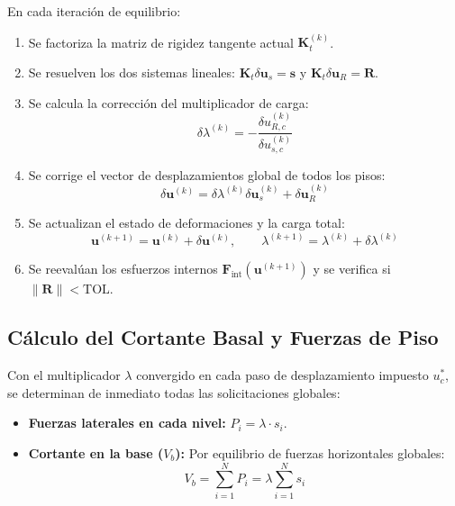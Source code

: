 \documentclass[11pt,letterpaper]{article}
\begin{document}
\begin{stepbox}
En cada iteración de equilibrio:
\begin{enumerate}
    \item Se factoriza la matriz de rigidez tangente actual $\mathbf{K}_t^{(k)}$.
    \item Se resuelven los dos sistemas lineales: $\mathbf{K}_t \delta \mathbf{u}_s = \mathbf{s}$ y $\mathbf{K}_t \delta \mathbf{u}_R = \mathbf{R}$.
    \item Se calcula la corrección del multiplicador de carga:
    $$\delta \lambda^{(k)} = -\frac{\delta u_{R,c}^{(k)}}{\delta u_{s,c}^{(k)}}$$
    \item Se corrige el vector de desplazamientos global de todos los pisos:
    $$\delta \mathbf{u}^{(k)} = \delta \lambda^{(k)} \delta \mathbf{u}_s^{(k)} + \delta \mathbf{u}_R^{(k)}$$
    \item Se actualizan el estado de deformaciones y la carga total:
    $$\mathbf{u}^{(k+1)} = \mathbf{u}^{(k)} + \delta \mathbf{u}^{(k)}, \qquad \lambda^{(k+1)} = \lambda^{(k)} + \delta \lambda^{(k)}$$
    \item Se reevalúan los esfuerzos internos $\mathbf{F}_{\text{int}}(\mathbf{u}^{(k+1)})$ y se verifica si $\|\mathbf{R}\| < \text{TOL}$.
\end{enumerate}
\end{stepbox}

\subsection{Cálculo del Cortante Basal y Fuerzas de Piso}
Con el multiplicador $\lambda$ convergido en cada paso de desplazamiento impuesto $u_c^*$, se determinan de inmediato todas las solicitaciones globales:
\begin{itemize}
    \item \textbf{Fuerzas laterales en cada nivel:} $P_i = \lambda \cdot s_i$.
    \item \textbf{Cortante en la base ($V_b$):} Por equilibrio de fuerzas horizontales globales:
    \begin{equation}
        V_b = \sum_{i=1}^N P_i = \lambda \sum_{i=1}^N s_i
        \label{eq:cortante_basal_vb}
    \end{equation}
\end{itemize}

\end{document}
